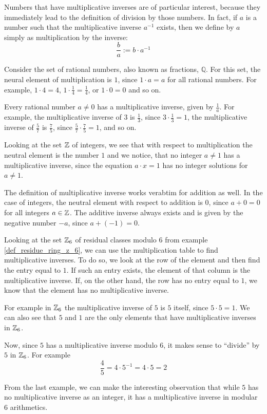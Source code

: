 Numbers that have multiplicative inverses are of particular interest, because they immediately lead to the definition of division by those numbers. In fact, if $a$ is a number such that the multiplicative inverse $a^{-1}$ exists, then we define  by $a$ simply as multiplication by the inverse:
\begin{equation}
\frac{b}{a}:= b\cdot a^{-1}
\end{equation}
\begin{example} Consider the set of rational numbers, also known as fractions, $\mathbb{Q}$. For this set, the neural element of multiplication is $1$, since $1\cdot a = a$ for all rational numbers. For example, $1\cdot 4=4$, $1\cdot \frac{1}{4}=\frac{1}{4}$, or $1\cdot 0 =0$ and so on.

Every rational number $a\neq 0$ has a multiplicative inverse, given by $\frac{1}{a}$. 
For example, the multiplicative inverse of $3$ is $\frac{1}{3}$, since $3\cdot \frac{1}{3}=1$, the multiplicative inverse of $\frac{5}{7}$ is $\frac{7}{5}$, since $\frac{5}{7}\cdot \frac{7}{5}=1$, and so on. 
\end{example}
\begin{example}Looking at  the set $\mathbb{Z}$ of integers, we see that with respect to multiplication the neutral element is the number $1$ and we notice, that no integer $a\neq 1$ has a multiplicative inverse, since the equation $a\cdot x =1$ has no integer solutions for $a\neq 1$. 

The definition of multiplicative inverse works verabtim for addition as well. In the case of integers, the neutral element with respect to addition is $0$, since $a+0=0$ for all integers $a\in\mathbb{Z}$. The additive inverse always exists and is given by the negative number $-a$, since $a+(-1)=0$.  
\end{example}
\begin{example} Looking at the set $\mathbb{Z}_6$ of residual classes modulo $6$ from example \ref{def_residue_ring_z_6}, we can use the multiplication table to find multiplicative inverses. To do so, we look at the row of the element and then find the entry equal to $1$. If such an entry exists, the element of that column is the multiplicative inverse. If, on the other hand, the row has no entry equal to $1$, we know that the element has no multiplicative inverse.

For example in $\mathbb{Z}_6$ the multiplicative inverse of $5$ is $5$ itself, since $5\cdot 5=1$. We can also see that $5$ and $1$ are the only elements that have multiplicative inverses in $\mathbb{Z}_6$. 

Now, since $5$ has a multiplicative inverse modulo $6$, it makes sense to ``divide'' by $5$ in $\mathbb{Z}_6$. For example
$$
\frac{4}{5}= 4\cdot 5^{-1} = 4\cdot 5 = 2
$$ 
\end{example}
From the last example, we can make the interesting observation that while $5$ has no multiplicative inverse as an integer, it has a multiplicative inverse in modular $6$ arithmetics. 

